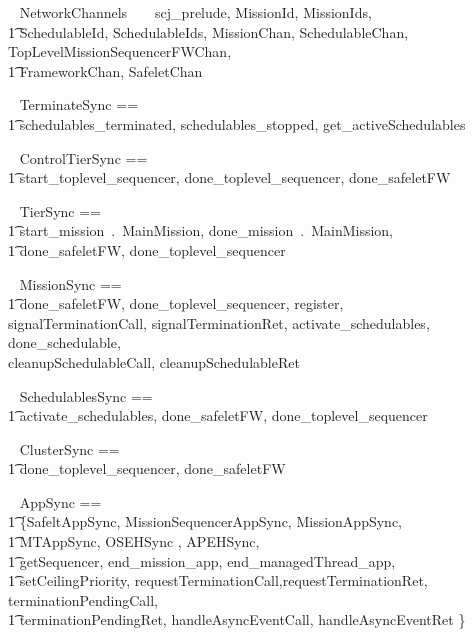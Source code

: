 

\begin{zsection}
	\SECTION ~ NetworkChannels ~ \parents ~ scj\_prelude, MissionId, MissionIds, \\
		\t1 SchedulableId, SchedulableIds, MissionChan, SchedulableChan, TopLevelMissionSequencerFWChan,\\
		\t1 FrameworkChan, SafeletChan
\end{zsection}
%
\begin{circus}
\circchannelset ~ TerminateSync == \\ \t1 \lchanset schedulables\_terminated, schedulables\_stopped, get\_activeSchedulables \rchanset
\end{circus}
%
\begin{circus}
\circchannelset ~ ControlTierSync ==\\ \t1 \lchanset start\_toplevel\_sequencer, done\_toplevel\_sequencer, done\_safeletFW \rchanset
\end{circus}
\begin{circus}
\circchannelset ~ TierSync == \\ \t1 \lchanset start\_mission~.~MainMission, done\_mission~.~MainMission,\\
	\t1 done\_safeletFW, done\_toplevel\_sequencer \rchanset
\end{circus}
%
\begin{circus}
\circchannelset ~ MissionSync == \\ \t1 \lchanset done\_safeletFW, done\_toplevel\_sequencer, register, \\
                 signalTerminationCall, signalTerminationRet, activate\_schedulables, done\_schedulable, \\
                 cleanupSchedulableCall, cleanupSchedulableRet  \rchanset
\end{circus}
%
\begin{circus}
\circchannelset ~ SchedulablesSync == \\ \t1 \lchanset activate\_schedulables, done\_safeletFW, done\_toplevel\_sequencer \rchanset
\end{circus}
%
\begin{circus}
\circchannelset ~ ClusterSync == \\ \t1 \lchanset done\_toplevel\_sequencer, done\_safeletFW \rchanset
\end{circus}
%
\begin{circus}
\circchannelset ~ AppSync == \\ \t1  \bigcup \{SafeltAppSync, MissionSequencerAppSync, MissionAppSync, \\ \t1 MTAppSync, OSEHSync , APEHSync,  \\ \t1
	\lchanset getSequencer, end\_mission\_app, end\_managedThread\_app, \\ \t1 setCeilingPriority, requestTerminationCall,requestTerminationRet, terminationPendingCall, \\ \t1 terminationPendingRet, handleAsyncEventCall, handleAsyncEventRet \rchanset  \}
\end{circus}
